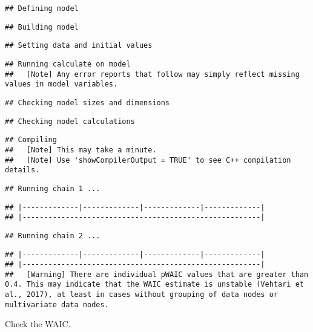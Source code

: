 \documentclass[
]{book}
\begin{document}
\begin{verbatim}
## Defining model
\end{verbatim}

\begin{verbatim}
## Building model
\end{verbatim}

\begin{verbatim}
## Setting data and initial values
\end{verbatim}

\begin{verbatim}
## Running calculate on model
##   [Note] Any error reports that follow may simply reflect missing values in model variables.
\end{verbatim}

\begin{verbatim}
## Checking model sizes and dimensions
\end{verbatim}

\begin{verbatim}
## Checking model calculations
\end{verbatim}

\begin{verbatim}
## Compiling
##   [Note] This may take a minute.
##   [Note] Use 'showCompilerOutput = TRUE' to see C++ compilation details.
\end{verbatim}

\begin{verbatim}
## Running chain 1 ...
\end{verbatim}

\begin{verbatim}
## |-------------|-------------|-------------|-------------|
## |-------------------------------------------------------|
\end{verbatim}

\begin{verbatim}
## Running chain 2 ...
\end{verbatim}

\begin{verbatim}
## |-------------|-------------|-------------|-------------|
## |-------------------------------------------------------|
##   [Warning] There are individual pWAIC values that are greater than 0.4. This may indicate that the WAIC estimate is unstable (Vehtari et al., 2017), at least in cases without grouping of data nodes or multivariate data nodes.
\end{verbatim}

Check the WAIC.
\end{document}

